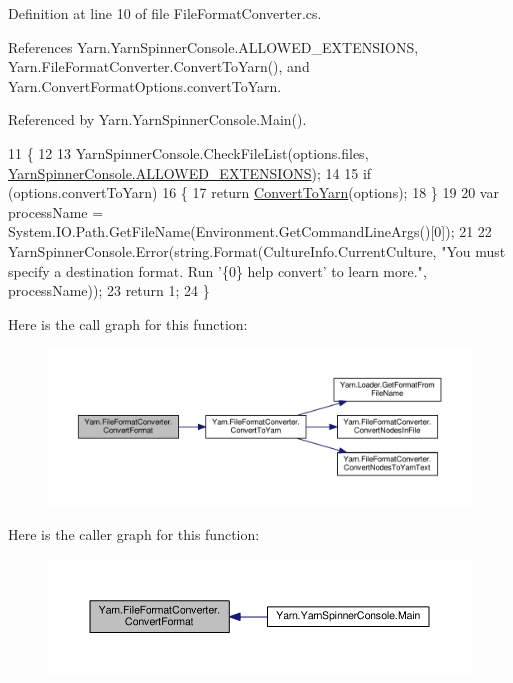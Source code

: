 Definition at line 10 of file File\-Format\-Converter.\-cs.



References Yarn.\-Yarn\-Spinner\-Console.\-A\-L\-L\-O\-W\-E\-D\-\_\-\-E\-X\-T\-E\-N\-S\-I\-O\-N\-S, Yarn.\-File\-Format\-Converter.\-Convert\-To\-Yarn(), and Yarn.\-Convert\-Format\-Options.\-convert\-To\-Yarn.



Referenced by Yarn.\-Yarn\-Spinner\-Console.\-Main().


\begin{DoxyCode}
11         \{
12 
13             YarnSpinnerConsole.CheckFileList(options.files, 
      \hyperlink{a00172_a0979de7ea02c8c0375b8220a12e6575e}{YarnSpinnerConsole.ALLOWED\_EXTENSIONS});
14 
15             \textcolor{keywordflow}{if} (options.convertToYarn)
16             \{
17                 \textcolor{keywordflow}{return} \hyperlink{a00100_a1e6cd39b0c813f21da278367dcff76d2}{ConvertToYarn}(options);
18             \}
19 
20             var processName = System.IO.Path.GetFileName(Environment.GetCommandLineArgs()[0]);
21 
22             YarnSpinnerConsole.Error(string.Format(CultureInfo.CurrentCulture, \textcolor{stringliteral}{"You must specify a
       destination format. Run '\{0\} help convert' to learn more."}, processName));
23             \textcolor{keywordflow}{return} 1;
24         \}
\end{DoxyCode}


Here is the call graph for this function\-:
\nopagebreak
\begin{figure}[H]
\begin{center}
\leavevmode
\includegraphics[width=350pt]{a00100_aa4db4ccac799c5f047a8b1a9efbe109d_cgraph}
\end{center}
\end{figure}




Here is the caller graph for this function\-:
\nopagebreak
\begin{figure}[H]
\begin{center}
\leavevmode
\includegraphics[width=350pt]{a00100_aa4db4ccac799c5f047a8b1a9efbe109d_icgraph}
\end{center}
\end{figure}


